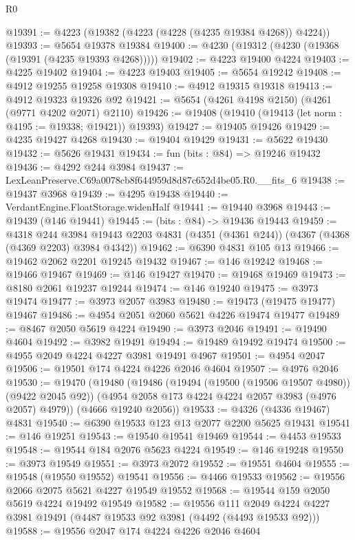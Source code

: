 \begin{lexlean}{R0}
\begin{coremodule}
@19391 := @4223 (@19382 (@4223 (@4228 (@4235 @19384 @4268)) @4224))
@19393 := @5654 @19378 @19384
@19400 := @4230 (@19312 (@4230 (@19368 (@19391 (@4235 @19393 @4268)))))
@19402 := @4223 @19400 @4224
@19403 := @4225 @19402
@19404 := @4223 @19403
@19405 := @5654 @19242
@19408 := @4912 @19255 @19258 @19308
@19410 := @4912 @19315 @19318
@19413 := @4912 @19323 @19326 @92
@19421 := @5654 (@4261 @4198 @2150) (@4261 (@9771 @4202 @2071) @2110)
@19426 := @19408 (@19410 (@19413 (let norm : @4195 := @19338; @19421)) @19393)
@19427 := @19405 @19426
@19429 := @4235 @19427 @4268
@19430 := @19404 @19429
@19431 := @5622 @19430
@19432 := @5626 @19431
@19434 := fun (bits : @84) => @19246 @19432
@19436 := @4292 @244 @3984
@19437 := LexLeanPreserve.C69a0078cb8f644959d8d87c652d4be05.R0.__fits_6
@19438 := @19437 @3968
@19439 := @4295 @19438
@19440 := VerdantEngine.FloatStorage.widenHalf
@19441 := @19440 @3968
@19443 := @19439 (@146 @19441)
@19445 := (bits : @84) -> @19436 @19443
@19459 := @4318
    @244
    @3984
    @19443
    @2203
    @4831
    (@4351 (@4361 @244))
    (@4367 (@4368 (@4369 @2203) @3984 @4342))
@19462 := @6390 @4831 @105 @13
@19466 := @19462 @2062 @2201 @19245 @19432
@19467 := @146 @19242
@19468 := @19466 @19467
@19469 := @146 @19427
@19470 := @19468 @19469
@19473 := @8180 @2061 @19237 @19244
@19474 := @146 @19240
@19475 := @3973 @19474
@19477 := @3973 @2057 @3983
@19480 := @19473 (@19475 @19477) @19467
@19486 := @4954 @2051 @2060 @5621 @4226 @19474 @19477
@19489 := @8467 @2050 @5619 @4224
@19490 := @3973 @2046
@19491 := @19490 @4604
@19492 := @3982 @19491
@19494 := @19489 @19492 @19474
@19500 := @4955 @2049 @4224 @4227 @3981 @19491 @4967
@19501 := @4954 @2047
@19506 := @19501 @174 @4224 @4226 @2046 @4604
@19507 := @4976 @2046
@19530 := @19470
    (@19480
      (@19486
        (@19494 (@19500 (@19506 @19507 @4980)) (@9422 @2045 @92))
        (@4954 @2058 @173 @4224 @4224 @2057 @3983 (@4976 @2057) @4979))
      (@4666 @19240 @2056))
@19533 := @4326 (@4336 @19467) @4831
@19540 := @6390 @19533 @123 @13 @2077 @2200 @5625 @19431
@19541 := @146 @19251
@19543 := @19540 @19541 @19469
@19544 := @4453 @19533
@19548 := @19544 @184 @2076 @5623 @4224
@19549 := @146 @19248
@19550 := @3973 @19549
@19551 := @3973 @2072
@19552 := @19551 @4604
@19555 := @19548 (@19550 @19552) @19541
@19556 := @4466 @19533
@19562 := @19556 @2066 @2075 @5621 @4227 @19549 @19552
@19568 := @19544 @159 @2050 @5619 @4224 @19492 @19549
@19582 := @19556
    @111
    @2049
    @4224
    @4227
    @3981
    @19491
    (@4487 @19533 @92 @3981 (@4492 (@4493 @19533 @92)))
@19588 := @19556 @2047 @174 @4224 @4226 @2046 @4604

\end{coremodule}
\end{lexlean}
